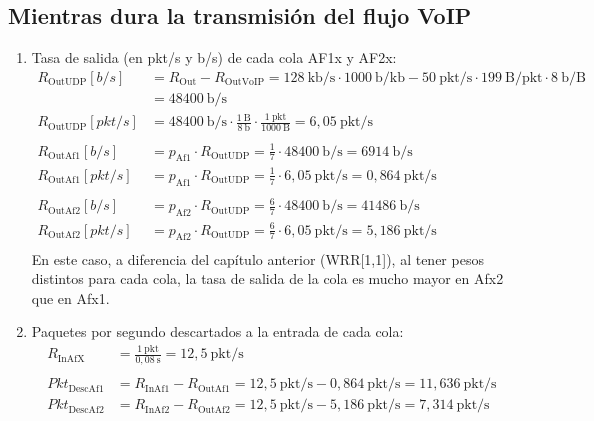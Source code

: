 \subsection{Mientras dura la transmisión del flujo VoIP}
\begin{enumerate}
    \item Tasa de salida (en pkt/s y b/s) de cada cola AF1x y AF2x:
    \[
        \begin{aligned}
            R_{\text{OutUDP}}[b/s] &= R_{\text{Out}} - R_{\text{OutVoIP}} = 128~\text{kb/s} \cdot 1000~\text{b/kb} - 50~\text{pkt/s} \cdot 199~\text{B/pkt} \cdot 8~\text{b/B} \\
                              &= 48400~\text{b/s} \\
            R_{\text{OutUDP}}[pkt/s] &= 48400~\text{b/s} \cdot \frac{1~\text{B}}{8~\text{b}} \cdot \frac{1~\text{pkt}}{1000~\text{B}} = 6,05~\text{pkt/s} \\ \\
            R_{\text{OutAf1}}[b/s] &= p_{\text{Af1}} \cdot R_{\text{OutUDP}} = \frac{1}{7} \cdot 48400~\text{b/s} = 6914~\text{b/s} \\
            R_{\text{OutAf1}}[pkt/s] &= p_{\text{Af1}} \cdot R_{\text{OutUDP}} = \frac{1}{7} \cdot 6,05~\text{pkt/s} = 0,864~\text{pkt/s} \\ \\
            R_{\text{OutAf2}}[b/s] &= p_{\text{Af2}} \cdot R_{\text{OutUDP}} = \frac{6}{7} \cdot 48400~\text{b/s} = 41486~\text{b/s} \\
            R_{\text{OutAf2}}[pkt/s] &= p_{\text{Af2}} \cdot R_{\text{OutUDP}} = \frac{6}{7} \cdot 6,05~\text{pkt/s} = 5,186~\text{pkt/s} \\
        \end{aligned}
    \]
    En este caso, a diferencia del capítulo anterior (WRR[1,1]), al tener pesos distintos para cada cola,
    la tasa de salida de la cola es mucho mayor en Afx2 que en Afx1.
    \item Paquetes por segundo descartados a la entrada de cada cola:
    \[
        \begin{aligned}
            R_{\text{InAfX}} &= \frac{1~\text{pkt}}{0,08~\text{s}} = 12,5~\text{pkt/s} \\ \\
            Pkt_{\text{DescAf1}} &= R_{\text{InAf1}} - R_{\text{OutAf1}} = 12,5~\text{pkt/s} - 0,864~\text{pkt/s} = 11,636~\text{pkt/s} \\
            Pkt_{\text{DescAf2}} &= R_{\text{InAf2}} - R_{\text{OutAf2}} = 12,5~\text{pkt/s} - 5,186~\text{pkt/s} = 7,314~\text{pkt/s} \\

\end{aligned}\]
\end{enumerate}
